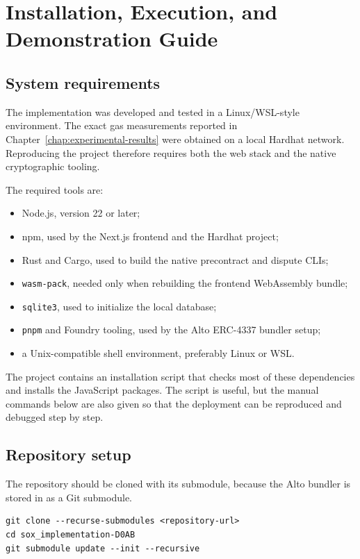 \chapter[Installation and Demonstration]{Installation, Execution, and Demonstration Guide}
\label{chap:installation-demo}

\section{System requirements}

The implementation was developed and tested in a Linux/WSL-style environment. The exact
gas measurements reported in Chapter~\ref{chap:experimental-results} were obtained on a
local Hardhat network. Reproducing the project therefore requires both the web stack and
the native cryptographic tooling.

The required tools are:

\begin{itemize}
  \item Node.js, version 22 or later;
  \item npm, used by the Next.js frontend and the Hardhat project;
  \item Rust and Cargo, used to build the native precontract and dispute CLIs;
  \item \texttt{wasm-pack}, needed only when rebuilding the frontend WebAssembly bundle;
  \item \texttt{sqlite3}, used to initialize the local database;
  \item \texttt{pnpm} and Foundry tooling, used by the Alto ERC-4337 bundler setup;
  \item a Unix-compatible shell environment, preferably Linux or WSL.
\end{itemize}

The project contains an installation script that checks most of these dependencies and
installs the JavaScript packages. The script is useful, but the manual commands below are
also given so that the deployment can be reproduced and debugged step by step.

\section{Repository setup}

The repository should be cloned with its submodule, because the Alto bundler is stored in
 as a Git submodule.

\begin{verbatim}
git clone --recurse-submodules <repository-url>
cd sox_implementation-D0AB
git submodule update --init --recursive
\end{verbatim}

